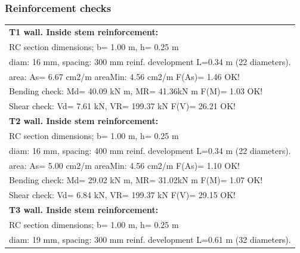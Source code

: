 \subsubsection{Reinforcement checks}

\tablelasttail{\hline}
\begin{center}
\begin{supertabular}[H]{|l|}
\hline
\textbf{T1 wall. Inside stem reinforcement:}\\
  RC section dimensions; b= 1.00 m, h= 0.25 m\\
  diam: 16 mm, spacing: 300 mm  reinf. development L=0.34 m (22 diameters).\\
  area: As=   6.67 cm2/m areaMin:   4.56 cm2/m  F(As)= 1.46 OK!\\
  Bending check: Md=  40.09 kN m, MR=  41.36kN m  F(M)= 1.03 OK!\\
  Shear check: Vd=   7.61 kN,  VR= 199.37 kN  F(V)= 26.21 OK!\\
\hline
\textbf{T2 wall. Inside stem reinforcement:}\\
  RC section dimensions; b= 1.00 m, h= 0.25 m\\
  diam: 16 mm, spacing: 400 mm  reinf. development L=0.34 m (22 diameters).\\
  area: As=   5.00 cm2/m areaMin:   4.56 cm2/m  F(As)= 1.10 OK!\\
  Bending check: Md=  29.02 kN m, MR=  31.02kN m  F(M)= 1.07 OK!\\
  Shear check: Vd=   6.84 kN,  VR= 199.37 kN  F(V)= 29.15 OK!\\
\hline
\textbf{T3 wall. Inside stem reinforcement:}\\
  RC section dimensions; b= 1.00 m, h= 0.25 m\\
  diam: 19 mm, spacing: 300 mm  reinf. development L=0.61 m (32 diameters).\\

\end{supertabular}
\end{center}
